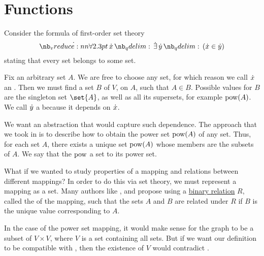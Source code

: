 \section{Functions}\label{sec:functions}

\begin{remark}\label{rem:function_definition}
  Consider the formula of first-order set theory
  \begin{equation}\label{eq:rem:function_definition}
    \qforall \synx \qexists \syny (\synx \in \syny)
  \end{equation}
  stating that every set belongs to some set.

  Fix an arbitrary set \( A \). We are free to choose any set, for which reason we call \( {\dot{x}} \) an . Then we must find a set \( B \) of \( V \),  on \( A \), such that \( A \in B \). Possible values for \( B \) are the singleton set \( \set{ A } \), as well as all its supersets, for example \( \operatorname{pow}(A) \). We call \( {\dot{y}} \) a  because it depends on \( {\dot{x}} \).

  We want an abstraction that would capture such dependence. The approach that we took in  is to describe how to obtain the power set \( \operatorname{pow}(A) \) of any set. Thus, for each set \( A \), there exists a unique set \( \operatorname{pow}(A) \) whose members are the subsets of \( A \). We say that the  \( \operatorname{pow} \)  a set to its power set.

  What if we wanted to study properties of a mapping and relations between different mappings? In order to do this via set theory, we must represent a mapping as a set. Many authors like ,  and  propose using a \hyperref[def:binary_relation]{binary relation} \( R \), called the  of the mapping, such that the sets \( A \) and \( B \) are related under \( R \) if \( B \) is the unique value corresponding to \( A \).

  In the case of the power set mapping, it would make sense for the graph to be a subset of \( V \times V \), where \( V \) is a set containing all sets. But if we want our definition to be compatible with \hyperref[def:zfc]{}, then the existence of \( V \) would contradict .


\end{remark}
